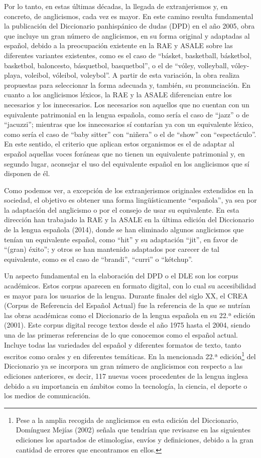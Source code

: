 \documentclass{textolivre}
\begin{document}
Por lo tanto, en estas últimas décadas, la llegada de extranjerismos y, en concreto, de anglicismos, cada vez es mayor. En este camino resulta fundamental la publicación del Diccionario panhispánico de dudas (DPD) en el año 2005, obra que incluye un gran número de anglicismos, en su forma original y adaptadas al español, debido a la preocupación existente en la RAE y ASALE sobre las diferentes variantes existentes, como es el caso de “básket, basketball, básketbol, basketbol, baloncesto, básquetbol, basquetbol”, o el de “vóley, volleyball, vóley-playa, voleibol, vóleibol, voleybol”. A partir de esta variación, la obra realiza propuestas para seleccionar la forma adecuada y, también, su pronunciación. En cuanto a los anglicismos léxicos, la RAE y la ASALE diferencian entre los necesarios y los innecesarios. Los necesarios son aquellos que no cuentan con un equivalente patrimonial en la lengua española, como sería el caso de “jazz” o de “jacuzzi”; mientras que los innecesarios sí contarían ya con un equivalente léxico, como sería el caso de “baby sitter” con “niñera” o el de “show” con “espectáculo”. En este sentido, el criterio que aplican estos organismos es el de adaptar al español aquellas voces foráneas que no tienen un equivalente patrimonial y, en segundo lugar, aconsejar el uso del equivalente español en los anglicismos que sí disponen de él.

Como podemos ver, a excepción de los extranjerismos originales extendidos en la sociedad, el objetivo es obtener una forma lingüísticamente “española”, ya sea por la adaptación del anglicismo o por el consejo de usar su equivalente. En esta dirección han trabajado la RAE y la ASALE en la última edición del Diccionario de la lengua española (2014), donde se han eliminado algunos anglicismos que tenían un equivalente español, como “hit” y su adaptación “jit”, en favor de “(gran) éxito”; y otros se han mantenido adaptados por carecer de tal equivalente, como es el caso de “brandi”, “curri” o “kétchup”.

Un aspecto fundamental en la elaboración del DPD o el DLE son los corpus académicos. Estos corpus aparecen en formato digital, con lo cual su accesibilidad es mayor para los usuarios de la lengua. Durante finales del siglo XX, el CREA (Corpus de Referencia del Español Actual) fue la referencia de la que se nutrían las obras académicas como el Diccionario de la lengua española en su 22.ª edición (2001). Este corpus digital recoge textos desde el año 1975 hasta el 2004, siendo una de las primeras referencias de lo que conocemos como el español actual. Incluye todas las variedades del español y diferentes formatos de texto, tanto escritos como orales y en diferentes temáticas. En la mencionada 22.ª edición\footnote{
Pese a la amplia recogida de anglicismos en esta edición del Diccionario, Domínguez Mejías (2002) señala que tendrían que revisarse en las siguientes ediciones los apartados de etimologías, envíos y definiciones, debido a la gran cantidad de errores que encontramos en ellos.
} del Diccionario ya se incorpora un gran número de anglicismos con respecto a las ediciones anteriores, es decir, 117 nuevas voces procedentes de la lengua inglesa debido a su importancia en ámbitos como la tecnología, la ciencia, el deporte o los medios de comunicación. 
\end{document}
